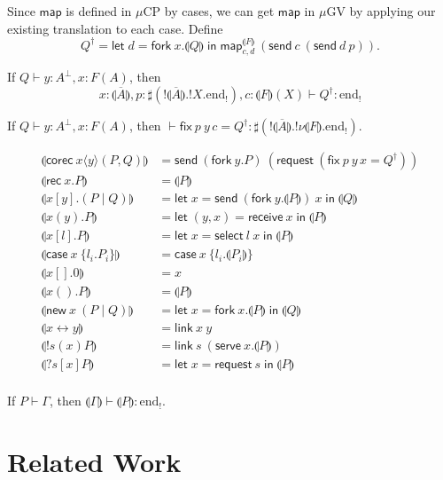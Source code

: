 \documentclass[orivec,envcountsame]{llncs}
\newcommand{\cpdual}[1]{#1^\perp}
\newcommand{\gvdual}[1]{\overline{#1}}
\newcommand{\gvout}[2]{{!#1.#2}}
\newcommand{\outterm}{\mathrm{end}_!}
\newcommand{\gvservice}[1]{\sharp #1}
\newcommand{\cptyp}[2]{#1 \vdash #2}
\newcommand{\gvtyp}[3]{#1 \vdash #2 : #3}
\newcommand{\mapname}{\mathsf{map}}
\newcommand{\gvmap}[3]{\mapname^{#1}_{#2}\:#3}
\newcommand{\mkwd}[1]{\mathsf{#1}}
\newcommand{\link}[2]{#1 \leftrightarrow #2}
\newcommand{\cut}[4]{\mkwd{new}\:#1 \: (#3 \mid #4)}
\newcommand{\replicate}[2]{{!#1(#2)}}
\newcommand{\derelict}[2]{{?#1[#2]}}
\newcommand{\rec}[1]{\mkwd{rec}\:#1}
\newcommand{\corec}[5]{\mkwd{corec}\:#1 \langle #2 \rangle (#4,#5)}
\newcommand{\clabel}[1]{\mathrm{#1}}
\renewcommand{\case}[2]{\mkwd{case}\:#1\:\{#2\}}
\newcommand{\sel}[2]{#1[\clabel{#2}]}
\newcommand{\gvsend}[2]{\mkwd{send}\:#1\:#2}
\newcommand{\gvreceive}[1]{\mkwd{receive}\:#1}
\newcommand{\gvlet}[3]{\mkwd{let}\;#1 = #2\;\mkwd{in}\;#3}
\newcommand{\gvselect}[2]{\mkwd{select}\:#1\:#2}
\newcommand{\gvcase}[2]{\mkwd{case}\:#1\:\{#2\}}
\newcommand{\gvlink}[2]{\mkwd{link}\:#1\:#2}
\newcommand{\gvfork}[2]{\mkwd{fork}\:#1.#2}
\newcommand{\lrkwd}{\mkwd{fix}}
\newcommand{\gvfix}[3]{\lrkwd\:#1\:#2 = #3}
\newcommand{\gvserve}[2]{\mkwd{serve}\:#1.#2}
\newcommand{\gvrequest}[1]{\mkwd{request}\:#1}
\newcommand{\togv}[1]{\llparenthesis #1 \rrparenthesis}
\newcommand{\mucp}{$\mu\mathrm{CP}$\xspace}
\newcommand{\mugv}{$\mu\mathrm{GV}$\xspace}
\begin{document}
Since $\mapname$ is defined in \mucp by cases, we can get $\mapname$ in \mugv by applying our
existing translation to each case.  Define
\[
  Q^\dagger = \gvlet{d}{\gvfork{x}{\togv{Q}}}{\gvmap{\togv{F}}{c,d}{(\gvsend{c}{(\gvsend{d}{p})})}}.
\]

\begin{lemma}
  If $\cptyp{Q}{y:\cpdual{A},x:F(A)}$, then
  \[
    \gvtyp{x:\gvdual{\togv{A}},p:\gvservice{(\gvout{\gvdual{\togv{A}}}{\gvout{X}{\outterm}})},c:\togv{F}(X)}{Q^\dagger}{\outterm}
  \]
\end{lemma}

\begin{corollary}
  If $\cptyp{Q}{y:\cpdual{A},x:F(A)}$, then $\gvtyp{}{\gvfix{p}{y\,c}{Q^\dagger}}{\gvservice{(\gvout{\gvdual{\togv{A}}}{\gvout{\nu \togv{F}}{\outterm}})}}$.
\end{corollary}

\begin{align*}
  \togv{\corec{x}{y}{}{P}{Q}} &= \gvsend{(\gvfork{y}{P})}{(\gvrequest{(\gvfix{p}{y\,x}{Q^\dagger})})} \\
  \togv{\rec{x}.P} &= \togv{P} \\
  \togv{x[y].(P \mid Q)} &=
    \gvlet{x}{\gvsend{(\gvfork{y}{\togv{P}})}{x}}{\togv{Q}} \\
  \togv{x(y).P} &=
    \gvlet{(y,x)}{\gvreceive{x}}{\togv{P}} \\
  \togv{\sel{x}{\mathit{l}}.P} &=
    \gvlet{x}{\gvselect{l}{x}}{\togv{P}} \\
  \togv{\case{x}{l_i.P_i}} &=
    \gvcase{x}{l_i.\togv{P_i}} \\
  \togv{x[].0} &= x \\
  \togv{x().P} &= \togv{P} \\
  \togv{\cut{x}{}{P}{Q}} &=
    \gvlet{x}{\gvfork{x}{\togv{P}}}{\togv{Q}} \\
  \togv{\link{x}{y}} &= \gvlink{x}{y} \\
  \togv{\replicate{s}{x}{P}} &=
    \gvlink{s}{(\gvserve{x}{\togv{P}})} \\
  \togv{\derelict{s}{x}{P}} &=
    \gvlet{x}{\gvrequest{s}}{\togv{P}} \\
\end{align*}

\begin{theorem}
  If $\cptyp{P}{\Gamma}$, then $\gvtyp{\togv{\Gamma}}{\togv{P}}{\outterm}$.
\end{theorem}

\section{Related Work}\label{sec:related}
\end{document}
